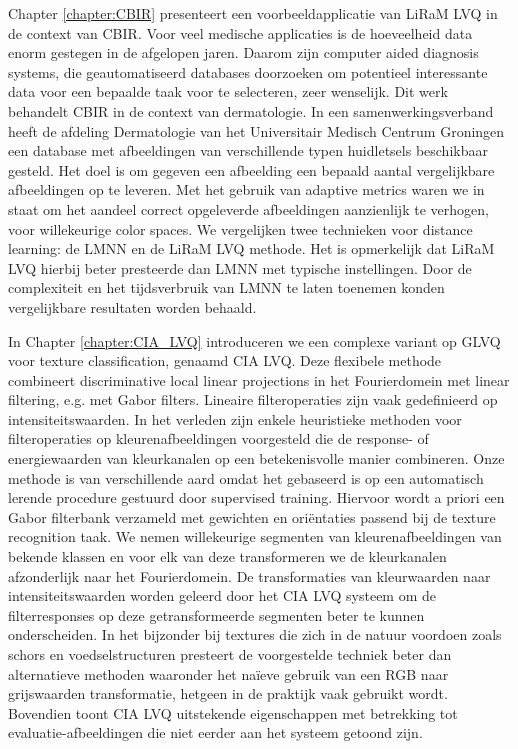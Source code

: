\documentclass[10pt,fleqn]{phdthesis}%
\begin{document}
Chapter \ref{chapter:CBIR} presenteert een voorbeeldapplicatie van \ac{LiRaM LVQ} in de context van \ac{CBIR}. 
Voor veel medische applicaties is de hoeveelheid data enorm gestegen in de afgelopen jaren. 
Daarom zijn computer aided diagnosis systems, die geautomatiseerd databases doorzoeken om potentieel interessante data voor een bepaalde 
taak voor te selecteren, zeer wenselijk. Dit werk behandelt \ac{CBIR} in de context van dermatologie. 
In een samenwerkingsverband heeft de afdeling Dermatologie van het Universitair Medisch Centrum Groningen een database met afbeeldingen 
van verschillende typen huidletsels beschikbaar gesteld. 
Het doel is om gegeven een afbeelding een bepaald aantal vergelijkbare afbeeldingen op te leveren. 
Met het gebruik van adaptive metrics waren we in staat om het aandeel correct opgeleverde afbeeldingen aanzienlijk te verhogen, 
voor willekeurige color spaces. 
We vergelijken twee technieken voor distance learning: de \ac{LMNN} en de \ac{LiRaM LVQ} methode. 
Het is opmerkelijk dat \ac{LiRaM LVQ} hierbij beter presteerde dan \ac{LMNN} met typische instellingen. 
Door de complexiteit en het tijdsverbruik van \ac{LMNN} te laten toenemen konden vergelijkbare resultaten worden behaald.

In Chapter \ref{chapter:CIA_LVQ} introduceren we een complexe variant op \ac{GLVQ} voor texture classification, genaamd \ac{CIA LVQ}. 
Deze flexibele methode combineert discriminative local linear projections in het Fourierdomein met linear filtering, e.g. met Gabor filters. 
Lineaire filteroperaties zijn vaak gedefinieerd op intensiteitswaarden. 
In het verleden zijn enkele heuristieke methoden voor filteroperaties op kleurenafbeeldingen voorgesteld die de response- of energiewaarden 
van kleurkanalen op een betekenisvolle manier combineren. 
Onze methode is van verschillende aard omdat het gebaseerd is op een automatisch lerende procedure gestuurd door supervised training. 
Hiervoor wordt a priori een Gabor filterbank verzameld met gewichten en ori\"entaties passend bij de texture recognition taak. 
We nemen willekeurige segmenten van kleurenafbeeldingen van bekende klassen en voor elk van deze transformeren we de kleurkanalen 
afzonderlijk naar het Fourierdomein. 
De transformaties van kleurwaarden naar intensiteitswaarden worden geleerd door het \ac{CIA LVQ} systeem om de filterresponses op 
deze getransformeerde segmenten beter te kunnen onderscheiden. 
In het bijzonder bij textures die zich in de natuur voordoen zoals schors en voedselstructuren presteert de voorgestelde techniek beter 
dan alternatieve methoden waaronder het na\"ieve gebruik van een RGB naar grijswaarden transformatie, hetgeen in de praktijk vaak 
gebruikt wordt. 
Bovendien toont \ac{CIA LVQ} uitstekende eigenschappen met betrekking tot evaluatie-afbeeldingen die niet eerder aan het systeem getoond zijn.
\end{document}
